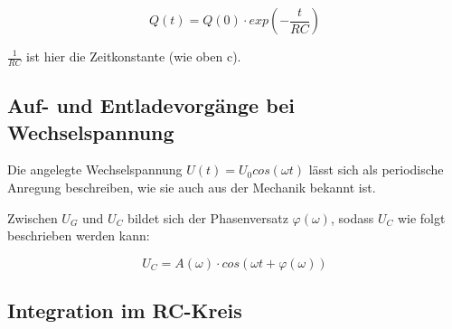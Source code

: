 \begin{equation}
    
Q(t) = Q(0)\cdot exp(-\frac{t}{RC})

\end{equation}

$\frac{1}{RC}$ ist hier die Zeitkonstante (wie oben c).


\subsection{Auf- und Entladevorgänge bei Wechselspannung}
\label{subsec:Entladevorgänge bei Wechselspannung}

Die angelegte Wechselspannung $U(t) = U_0 cos(\omega t)$ lässt sich als periodische Anregung beschreiben, 
wie sie auch aus der Mechanik bekannt ist.

Zwischen $U_G$ und $U_C$ bildet sich der Phasenversatz $\varphi(\omega)$, sodass $U_C$ wie folgt beschrieben werden
kann:

\begin{equation}
    U_C = A(\omega) \cdot cos(\omega t + \varphi(\omega))
\end{equation}


\subsection{Integration im RC-Kreis}
\label{subsec:Integration im RC-Kreis}


\cite{sample}
